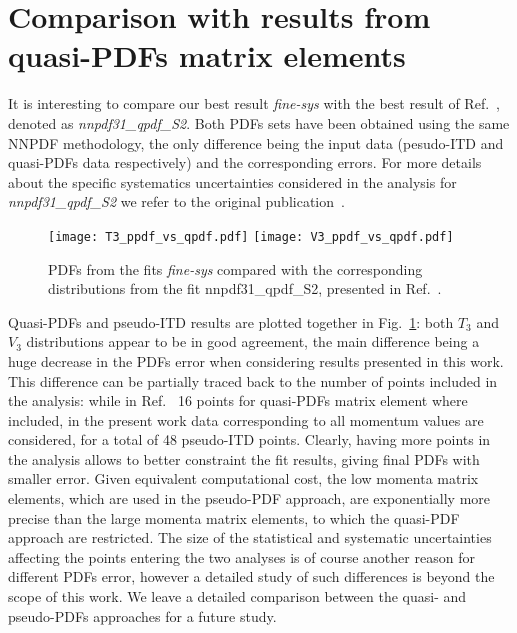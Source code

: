 \section{Comparison with results from quasi-PDFs matrix elements}
%
It is interesting to compare our best result \textit{fine-sys} with the best result of Ref.~\cite{Cichy2019},
denoted as \textit{nnpdf31\_qpdf\_S2}. 
Both PDFs sets have been obtained using the same NNPDF methodology, the only difference 
being the input data (pesudo-ITD and quasi-PDFs data respectively) and the corresponding errors.
For more details about the specific systematics uncertainties considered in the analysis for \textit{nnpdf31\_qpdf\_S2} we refer 
to the original publication~\cite{Cichy2019}.
\begin{figure}[h!]
    \center
    \texttt{[image: T3\_ppdf\_vs\_qpdf.pdf]}
    \texttt{[image: V3\_ppdf\_vs\_qpdf.pdf]}
    \caption{PDFs from the fits \textit{fine-sys} compared with the corresponding distributions from 
    the fit nnpdf31\_qpdf\_S2, presented in Ref.~\cite{Cichy2019}.}
    \label{fig::ppdf_vs_qpdf}
\end{figure} 
Quasi-PDFs and pseudo-ITD results are plotted together in Fig.~\ref{fig::ppdf_vs_qpdf}: 
both $T_3$ and $V_3$ distributions appear to be in good agreement, the main difference being a huge decrease in the 
PDFs error when considering results presented in this work. 
This difference can be partially traced back to the number of points included in the analysis: while in Ref.~\cite{Cichy2019}
16 points for quasi-PDFs matrix element where included, in the present work data corresponding to all momentum values are considered,
for a total of 48 pseudo-ITD points.
Clearly, having more points in the analysis allows to better constraint the fit results, giving final PDFs with smaller error.
%
 Given equivalent computational cost, the low momenta matrix elements, which are used in the pseudo-PDF approach, are exponentially more precise than the large momenta matrix elements, to which the quasi-PDF approach are restricted. The size of the statistical and systematic uncertainties affecting the points entering the two analyses is of course another
reason for different PDFs error, however a detailed study of such differences is beyond the scope of this work.
We leave a detailed comparison between the quasi- and pseudo-PDFs approaches for a future study.